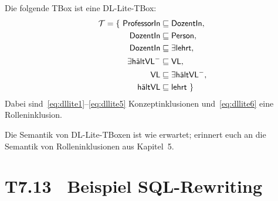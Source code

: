 \documentclass[fontsize=11pt, twoside=false, numbers=autoenddot]{scrbook}
\begin{document}
Die folgende TBox ist eine DL-Lite-TBox:  
%
\begin{align}
  \mathcal{T} = \{\ \textsf{ProfessorIn}& \sqsubseteq\textsf{DozentIn},
  \label{eq:dllite1} \\
  \textsf{DozentIn}& \sqsubseteq\textsf{Person}, \label{eq:dllite2} \\
  \textsf{DozentIn}& \sqsubseteq\exists \textsf{lehrt},
  \label{eq:dllite3} \\
  \exists\textsf{hältVL}^-& \sqsubseteq\textsf{VL}, \label{eq:dllite4} \\
  \textsf{VL}& \sqsubseteq\exists\textsf{hältVL}^-, \label{eq:dllite5} \\
  \textsf{hältVL}& \sqsubseteq\textsf{lehrt}\ \} \label{eq:dllite6}
\end{align}
%
Dabei sind~\eqref{eq:dllite1}--\eqref{eq:dllite5} Konzeptinklusionen
und~\eqref{eq:dllite6} eine Rolleninklusion. 

Die Semantik von DL-Lite-TBoxen ist wie erwartet; erinnert euch an die
Semantik von Rolleninklusionen aus Kapitel~5.

\newcommand{\BspRewriting}{T7.13}
\section*{\hypertarget{BspRewriting}{\BspRewriting}~ Beispiel SQL-Rewriting}
\end{document}
